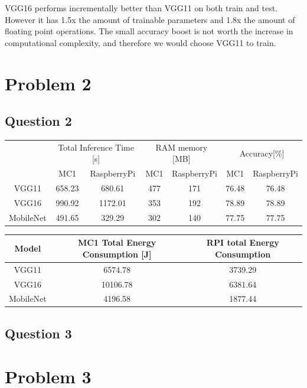 \documentclass{article}
\begin{document}
VGG16 performs incrementally better than VGG11 on both train and test. However it has 1.5x the amount of trainable parameters and 1.8x the amount of floating point operations. 
The small accuracy boost is not worth the increase in computational complexity, and therefore we would choose VGG11 to train. 

\section*{Problem 2}
\subsection*{Question 2}
\begin{center}
\begin{tabular}{|*{7}{c|}}
    \hline
      & \multicolumn{2}{c|}{Total Inference Time [s]}  & \multicolumn{2}{c|}{RAM memory [MB]} & \multicolumn{2}{c|}{Accuracy[\%]} \\
    \cline{1-7}
      & MC1 & RaspberryPi & MC1 & RaspberryPi & MC1 & RaspberryPi \\
    \hline
    VGG11 & 658.23 & 680.61 & 477 & 171 & 76.48 & 76.48\\
    \hline
    VGG16 & 990.92 & 1172.01 & 353 & 192 & 78.89 & 78.89\\
    \hline
    MobileNet & 491.65 & 329.29 & 302 & 140 & 77.75 & 77.75\\
    \hline
\end{tabular}
\end{center}

\begin{center}
    \begin{tabular}{|*{3}{c|}}
        \hline
        Model & MC1 Total Energy Consumption [J] & RPI total Energy Consumption \\
        \hline
        VGG11 & 6574.78 & 3739.29 \\
        \hline
        VGG16 & 10106.78 & 6381.64 \\
        \hline
        MobileNet & 4196.58 & 1877.44 \\
        \hline
    \end{tabular}
\end{center}
\subsection*{Question 3}
\section*{Problem 3}
\end{document}
